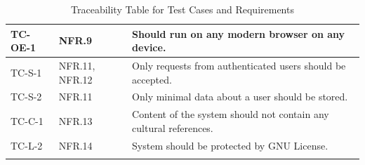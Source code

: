 \documentclass[12pt, titlepage]{article}
\begin{document}
\begin{longtable}{| p{2.5cm} | p{3cm} | p{8cm}| }
     \hline
    TC-OE-1 & NFR.9 & Should run on any modern browser on any device. \\
     \hline
    TC-S-1 & NFR.11, NFR.12 & Only requests from authenticated users should be accepted. \\
     \hline
    TC-S-2 & NFR.11 & Only minimal data about a user should be stored.\\
     \hline
    TC-C-1 & NFR.13 & Content of the system should not contain any cultural references.\\
     \hline
    TC-L-2 & NFR.14 & System should be protected by GNU License.\\
     \hline
    \caption{Traceability Table for Test Cases and Requirements}
    \label{tab:trace}
\end{longtable}
\end{document}
